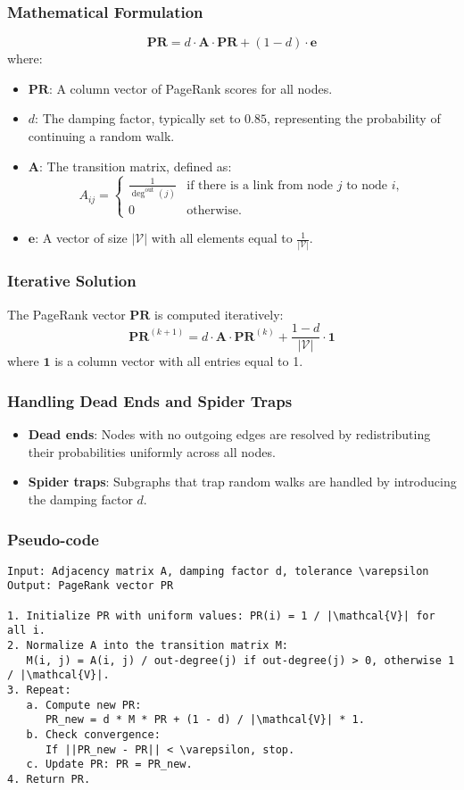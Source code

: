 \documentclass[12pt, a4paper,oneside]{book}
\begin{document}
\subsubsection*{Mathematical Formulation}
\[
\mathbf{PR} = d \cdot \mathbf{A} \cdot \mathbf{PR} + (1 - d) \cdot \mathbf{e}
\]
where:
\begin{itemize}
    \item \( \mathbf{PR} \): A column vector of PageRank scores for all nodes.
    \item \( d \): The damping factor, typically set to \( 0.85 \), representing the probability of continuing a random walk.
    \item \( \mathbf{A} \): The transition matrix, defined as:
    \[
    A_{ij} =
    \begin{cases}
    \frac{1}{\deg^{\text{out}}(j)} & \text{if there is a link from node } j \text{ to node } i, \\
    0 & \text{otherwise.}
    \end{cases}
    \]
    \item \( \mathbf{e} \): A vector of size \( |\mathcal{V}| \) with all elements equal to \( \frac{1}{|\mathcal{V}|} \).
\end{itemize}

\subsubsection*{Iterative Solution}
The PageRank vector \( \mathbf{PR} \) is computed iteratively:
\[
\mathbf{PR}^{(k+1)} = d \cdot \mathbf{A} \cdot \mathbf{PR}^{(k)} + \frac{1 - d}{|\mathcal{V}|} \cdot \mathbf{1}
\]
where \( \mathbf{1} \) is a column vector with all entries equal to 1.

\subsubsection*{Handling Dead Ends and Spider Traps}
\begin{itemize}
    \item \textbf{Dead ends}: Nodes with no outgoing edges are resolved by redistributing their probabilities uniformly across all nodes.
    \item \textbf{Spider traps}: Subgraphs that trap random walks are handled by introducing the damping factor \( d \).
\end{itemize}

\subsubsection*{Pseudo-code}
\begin{verbatim}
Input: Adjacency matrix A, damping factor d, tolerance \varepsilon
Output: PageRank vector PR

1. Initialize PR with uniform values: PR(i) = 1 / |\mathcal{V}| for all i.
2. Normalize A into the transition matrix M:
   M(i, j) = A(i, j) / out-degree(j) if out-degree(j) > 0, otherwise 1 / |\mathcal{V}|.
3. Repeat:
   a. Compute new PR:
      PR_new = d * M * PR + (1 - d) / |\mathcal{V}| * 1.
   b. Check convergence:
      If ||PR_new - PR|| < \varepsilon, stop.
   c. Update PR: PR = PR_new.
4. Return PR.
\end{verbatim}
\end{document}
